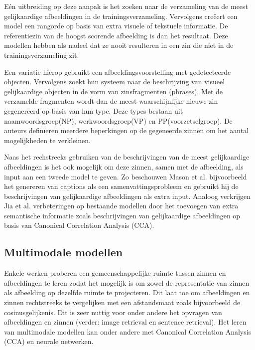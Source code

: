 E\'en uitbreiding op deze aanpak is het zoeken naar de verzameling van de meest gelijkaardige afbeeldingen in de trainingsverzameling. Vervolgens cre\"eert een model een rangorde op basis van extra visuele of tekstuele informatie. De referentiezin van de hoogst scorende afbeelding is dan het resultaat\cite{Devlin2015a,Hodosh2013,Ordonez2011,Oliva2006}. 
Deze modellen hebben als nadeel dat ze nooit resulteren in een zin die niet in de trainingsverzameling zit.

Een variatie\cite{Gupta2012,Kuznetsova2012} hierop gebruikt een afbeeldingsvoorstelling met gedetecteerde objecten. Vervolgens zoekt hun systeem naar de beschrijving van visueel gelijkaardige objecten in de vorm van zinsfragmenten (phrases). Met de verzamelde fragmenten wordt dan de meest waarschijnlijke nieuwe zin gegenereerd op basis van hun type. Deze types bestaan uit naamwoordsgroep(NP), werkwoordsgroep(VP) en PP(voorzetselgroep). De auteurs defin\"ieren meerdere beperkingen op de gegeneerde zinnen om het aantal mogelijkheden te verkleinen.

Naas het rechstreeks gebruiken van de beschrijvingen van de meest gelijkaardige afbeeldingen is het ook mogelijk om deze zinnen, samen met de afbeelding, als input aan een tweede model te geven. Zo beschouwen Mason et al.\cite{Mason2014} bijvoorbeeld het genereren van captions als een samenvattingsprobleem en gebruikt hij de beschrijvingen van gelijkaardige afbeeldingen als extra input. Analoog verkrijgen Jia et al.\cite{Fernando2015} verbeteringen op bestaande modellen door het toevoegen van extra semantische informatie zoals beschrijvingen van gelijkaardige afbeeldingen op basis van Canonical Correlation Analysis (CCA).
 
\subsection{Multimodale modellen}
Enkele werken proberen een gemeenschappelijke ruimte tussen zinnen en afbeeldingen te leren zodat het mogelijk is om zowel de representatie van zinnen als afbeelding op dezelfde ruimte te projecteren. Dit laat toe om afbeeldingen en zinnen rechtstreeks te vergelijken met een afstandsmaat zoals bijvoorbeeld de cosinusgelijkenis. Dit is zeer nuttig voor onder andere het opvragen van afbeeldingen en zinnen (verder: image retrieval en sentence retrieval). Het leren van multimodale modellen kan onder andere met Canonical Correlation Analysis (CCA)\cite{Hodosh2013} en neurale netwerken\cite{Mao2014,Karpathy2014,Kiros2013}. 

